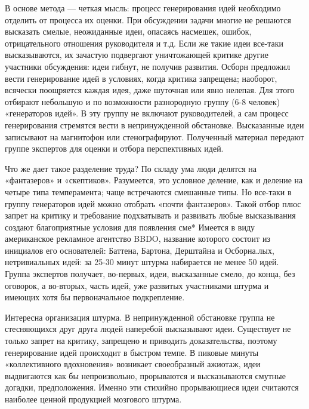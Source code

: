 В основе метода — четкая  мысль: процесс генерирования идей необходимо
отделить  от  процесса их  оценки.  При  обсуждении задачи  многие  не
решаются  высказать  смелые,   неожиданные  идеи,  опасаясь  насмешек,
ошибок,  отрицательного отношения  руководителя и  т.д. Если  же такие
идеи  все-таки  высказываются,  их  зачастую  подвергают  уничтожающей
критике другие участники обсуждения: идеи гибнут, не получив развития.
Осборн предложил  вести генерирование  идей в условиях,  когда критика
запрещена; наоборот,  всячески поощряется  каждая идея,  даже шуточная
или  явно  нелепая. Для  этого  отбирают  небольшую и  по  возможности
разнородную группу (6-8  человек) «генераторов идей». В  эту группу не
включают руководителей, а сам  процесс генерирования стремятся вести в
непринужденной обстановке.  Высказанные идеи записывают  на магнитофон
или стенографируют. Полученный материал  передают группе экспертов для
оценки и отбора перспективных идей.

Что  же  дает такое  разделение  труда?  По  складу ума  люди  делятся
на  «фантазеров»  и  «скептиков». Разумеется,  это  условное  деление,
как  и   деление  на   четыре  типа  темперамента;   чаще  встречаются
смешанные  типы.   Но  все-таки   в  группу  генераторов   идей  можно
отобрать  «почти  фантазеров».  Такой  отбор плюс  запрет  на  критику
и  требование  подхватывать  и развивать  любые  высказывания  создают
благоприятные условия  для появления сме* Имеется  в виду американское
рекламное агентство  BBDO, название которого состоит  из инициалов его
основателей: Баттена, Бартона,  Дерштайна и Осборна.лых, нетривиальных
идей:  за 25-30  минут  штурма  набирается не  менее  50 идей.  Группа
экспертов получает, во-первых, идеи,  высказанные смело, до конца, без
оговорок, а во-вторых,  часть идей, уже развитых  участниками штурма и
имеющих хотя бы первоначальное подкрепление.

Интересна организация  штурма. В  непринужденной обстановке  группа не
стесняющихся друг  друга людей наперебой высказывают  идеи. Существует
не  только запрет  на критику,  запрещено и  приводить доказательства,
поэтому  генерирование  идей происходит  в  быстром  темпе. В  пиковые
минуты  «коллективного  вдохновения» возникает  своеобразный  ажиотаж,
идеи  выдвигаются как  бы непроизвольно,  прорываются и  высказываются
смутные догадки, предположения. Именно эти стихийно прорывающиеся идеи
считаются наиболее ценной продукцией мозгового штурма.

